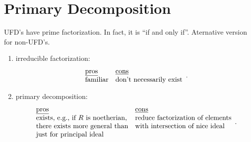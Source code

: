 \chapter{Primary Decomposition}

\begin{discussion}
    UFD's have prime factorization. In fact, it is ``if and only if''. Aternative version for non-UFD's.
    \begin{enumerate}
        \item irreducible factorization: 
            \[
                \begin{array}{ll}
                    \text{\underline{pros}} & \text{\underline{cons}} \\
                    \text{familiar} & \text{don't necessarily exist} 
                \end{array}.
            \]
        \item 
            primary decomposition:
            \[
                \begin{array}{ll}
                    \text{\underline{pros}} & \text{\underline{cons}} \\
                    \text{exists, e.g., if $R$ is noetherian,} & \text{reduce factorization of elements} \\
                \text{there exists more general than} & \text{with intersection of nice ideal}\\
                \text{just for principal ideal}
                \end{array}.
            \]
    \end{enumerate}
\end{discussion}
